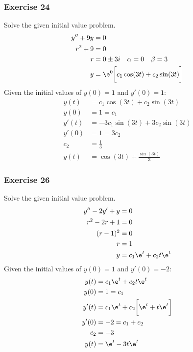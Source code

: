\documentclass{math}
\begin{document}
\subsubsection*{Exercise 24}
Solve the given initial value problem.
\begin{align*}
  y''+9y &= 0 \\
  r^2+9 &= 0 \\
  r &= 0\pm3i \quad \alpha = 0 \quad \beta = 3 \\
  y &= \e^{0}\bigg[c_1\cos(3t)+c_2\sin(3t)\bigg] \\
\end{align*}
Given the initial values of \( y(0) = 1 \) and \( y'(0) = 1 \):
\begin{align*}
  y(t) &= c_1\cos(3t)+c_2\sin(3t) \\
  y(0) &= 1 = c_1 \\
  y'(t) &= -3c_1\sin(3t)+3c_2\sin(3t) \\
  y'(0) &= 1 = 3c_2 \\
  c_2 &= \frac{1}{3} \\
  y(t) &= \cos(3t)+\frac{\sin(3t)}{3}
\end{align*}

\subsubsection*{Exercise 26}
Solve the given initial value problem.
\begin{align*}
  y''-2y'+y &= 0 \\
  r^2-2r+1 &= 0 \\
  (r-1)^2 &= 0 \\
  r &= 1 \\
  y &= c_1\e^{t}+c_2t\e^{t}
\end{align*}
Given the initial values of \( y(0) = 1 \) and \( y'(0) = -2 \):
\begin{align*}
  y(t) &= c_1\e^{t}+c_2t\e^{t} \\
  y(0) &= 1 = c_1 \\
  y'(t) &= c_1\e^{t}+c_2\bigg[\e^t+t\e^t\bigg] \\
  y'(0) &= -2 = c_1+c_2 \\
  c_2 &= -3 \\
  y(t) &= \e^t-3t\e^t
\end{align*}
\end{document}

